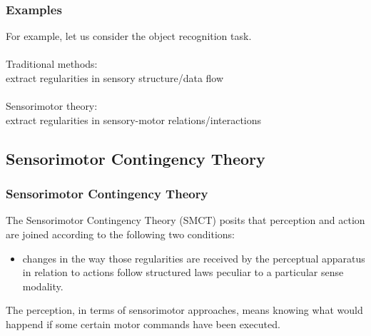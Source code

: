 \documentclass{beamer}
\begin{document}
\begin{frame}
\frametitle{Examples}
For example, let us consider the object recognition task.
\\~\\


Traditional methods:\\ 
extract regularities in sensory structure/data flow 
\\~\\


Sensorimotor theory:\\
extract regularities in sensory-motor relations/interactions


\end{frame}






\subsection{Sensorimotor Contingency Theory} %
\begin{frame}
\frametitle{Sensorimotor Contingency Theory}


The Sensorimotor Contingency Theory (SMCT) posits that perception and action are joined according to the following two conditions:
\begin{itemize}
\item changes in the way those regularities are received by the perceptual apparatus in relation to actions follow structured laws peculiar to a particular sense modality.
\end{itemize}


The perception, in terms of sensorimotor approaches, means knowing what would happend if some certain motor commands have been executed. 

\end{frame}
\end{document}
